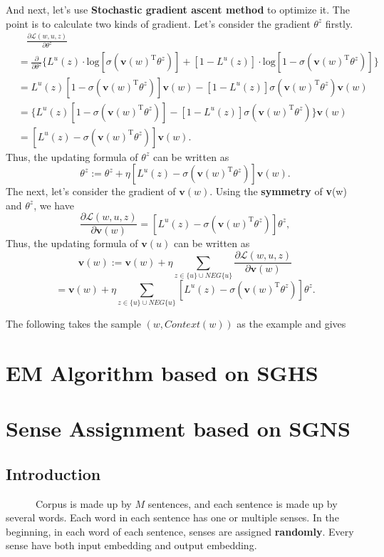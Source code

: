 \documentclass[12pt,a4paper,twoside]{book}
\begin{document}
And next, let's use \textbf{Stochastic gradient ascent method} to optimize it. The point is to calculate two kinds of gradient. Let's consider the gradient $\theta^z$ firstly.
\begin{align*}
& \ \ \ \ \frac{\partial\mathcal{L}(w,u,z)}{\partial\theta^z} \\
& =  \frac{\partial}{\partial\theta^z} \{ L^u(z)\cdot \mathrm{log}[\sigma(\mathbf{v}(w)^{\mathrm{T}}\theta^z)]+[1-L^u(z)]\cdot\mathrm{log}[1-\sigma(\mathbf{v}(w)^{\mathrm{T}}\theta^z)] \} \\
& =  L^u(z)[1-\sigma(\mathbf{v}(w)^{\mathrm{T}}\theta^z)]\mathbf{v}(w) - [1-L^u(z)]\sigma(\mathbf{v}(w)^{\mathrm{T}}\theta^z)\mathbf{v}(w) \\
& = \{L^u(z)[1-\sigma(\mathbf{v}(w)^{\mathrm{T}}\theta^z)]-[1-L^u(z)]\sigma(\mathbf{v}(w)^{\mathrm{T}}\theta^z)\}\mathbf{v}(w) \\
& = [L^u(z)-\sigma(\mathbf{v}(w)^{\mathrm{T}}\theta^z)] \mathbf{v}(w).
\end{align*}
Thus, the updating formula of $\theta^z$ can be written as
$$\theta^z:=\theta^z+\eta[L^u(z)-\sigma(\mathbf{v}(w)^{\mathrm{T}}\theta^z)]\mathbf{v}(w).$$
The next, let's consider the gradient of $\mathbf{v}(w)$. Using the \textbf{symmetry} of \textbf{v}(w) and $\theta^z$, we have
$$\frac{\partial\mathcal{L}(w,u,z)}{\partial\mathbf{v}(w)} = [L^u(z)-\sigma(\mathbf{v}(w)^{\mathrm{T}}\theta^z)]\theta^z,$$
Thus, the updating formula of $\mathbf{v}(u)$ can be written as 
$$\mathbf{v}(w):=\mathbf{v}(w)+\eta\sum_{z\in\{u\}\cup NEG\{u\}}\frac{\partial\mathcal{L}(w,u,z)}{\partial\mathbf{v}(w)}$$
$$=\mathbf{v}(w)+\eta\sum_{z\in\{u\}\cup NEG\{u\}}[L^u(z)-\sigma(\mathbf{v}(w)^{\mathrm{T}}\theta^z)]\theta^z.$$

The following takes the sample $(w,Context(w))$ as the example and gives 

\section{EM Algorithm based on SGHS}
\section{Sense Assignment based on SGNS}
\subsection{Introduction}
\ \ \ \ \ \ Corpus is made up by $M$ sentences, and each sentence is made up by several words. Each word in each sentence has one or multiple senses. In the beginning, in each word of each sentence, senses are assigned \textbf{randomly}. Every sense have both input embedding and output embedding.\\
\end{document}
